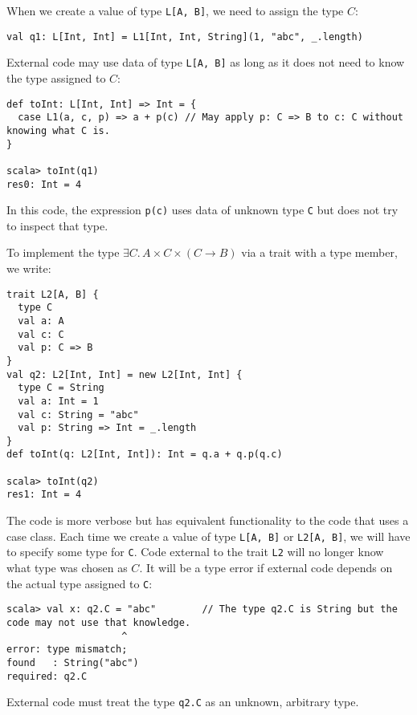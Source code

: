 When we create a value of type \lstinline!L[A, B]!,
we need to assign the type $C$:
\begin{lstlisting}
val q1: L[Int, Int] = L1[Int, Int, String](1, "abc", _.length)
\end{lstlisting}
External code may use data of type \lstinline!L[A, B]!
as long as it does not need to know the type assigned to $C$:
\begin{lstlisting}
def toInt: L[Int, Int] => Int = {
  case L1(a, c, p) => a + p(c) // May apply p: C => B to c: C without knowing what C is.
}

scala> toInt(q1)
res0: Int = 4
\end{lstlisting}
In this code, the expression \lstinline!p(c)!
uses data of unknown type \lstinline!C!
but does not try to inspect that type.

To implement the type $\exists C.\,A\times C\times\left(C\rightarrow B\right)$
via a trait with a type member, we write:
\begin{lstlisting}
trait L2[A, B] {
  type C
  val a: A
  val c: C
  val p: C => B
}
val q2: L2[Int, Int] = new L2[Int, Int] {
  type C = String
  val a: Int = 1
  val c: String = "abc"
  val p: String => Int = _.length
}
def toInt(q: L2[Int, Int]): Int = q.a + q.p(q.c)

scala> toInt(q2)
res1: Int = 4
\end{lstlisting}
The code is more verbose but has equivalent functionality to the code
that uses a case class. Each time we create a value of type \lstinline!L[A, B]!
or \lstinline!L2[A, B]!,
we will have to specify some type for \lstinline!C!.
Code external to the trait \lstinline!L2!
will no longer know what type was chosen as $C$. It will be a type
error if external code depends on the actual type assigned to \lstinline!C!:
\begin{lstlisting}
scala> val x: q2.C = "abc"        // The type q2.C is String but the code may not use that knowledge.
                    ^
error: type mismatch;
found   : String("abc")
required: q2.C
\end{lstlisting}
External code must treat the type \lstinline!q2.C!
as an unknown, arbitrary type.

